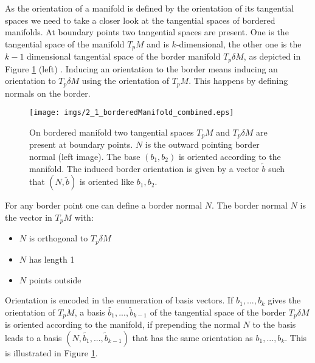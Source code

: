  As the orientation of a manifold is defined by the orientation of its tangential spaces we need to take a closer look at the tangential spaces of bordered manifolds.
At boundary points two tangential spaces are present. One is the tangential space of the manifold $T_pM$ and is $k$-dimensional, the other one is the $k-1$ dimensional tangential space of the border manifold $T_p \delta M$, as depicted in Figure \ref{fig::2_1_borderManifold} (left) . Inducing an orientation to the border means inducing an orientation to $T_p\delta M$ using the orientation of $T_p M$. This happens by defining normals on the border.

\begin{figure}
\begin{center}
\texttt{[image: imgs/2\_1\_borderedManifold\_combined.eps]}
\end{center}
\caption{On bordered manifold two tangential spaces $T_pM$ and $T_p\delta M$  are present at boundary points. $N$ is the outward pointing border normal (left image). The base $(b_1,b_2)$ is oriented according to the manifold. The induced border orientation is given by a vector $\widetilde{b}$ such that  $(N, \widetilde{b})$ is oriented like $b_1,b_2$.}
\label{fig::2_1_borderManifold}
\end{figure}

For any border point one can define a border normal $N$. The border normal $N$ is the vector in $T_p M$ with:
\begin{itemize}
\item $N$ is orthogonal to $T_p \delta M$
\item $N$ has length 1
\item $N$ points outside
\end{itemize}

Orientation is encoded in the enumeration of basis vectors. If $b_1,...,b_k$ gives the orientation of $T_pM$,
a basis $\widetilde{b_1},...,\widetilde{ b}_{k-1}$ of the tangential space of the border $T_p\delta M$ is oriented according to the manifold, if prepending the normal $N$ to the basis leads to a basis $(N,\widetilde{b_1},...,\widetilde{ b}_{k-1})$ that has the same orientation as $b_1,...,b_k$. This is illustrated in Figure \ref{fig::2_1_borderManifold}.


